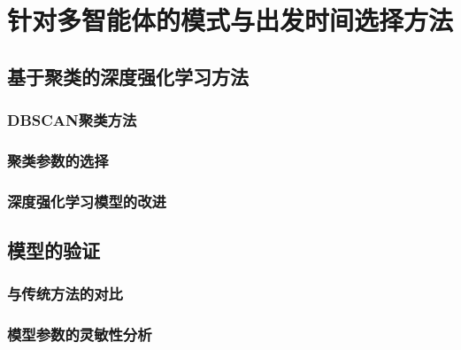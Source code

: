 \chapter{针对多智能体的模式与出发时间选择方法}
\label{chp:bib}

\section{基于聚类的深度强化学习方法}

\subsection{DBSCAN聚类方法}

\subsection{聚类参数的选择}

\subsection{深度强化学习模型的改进}


\section{模型的验证}

\subsection{与传统方法的对比}

\subsection{模型参数的灵敏性分析}